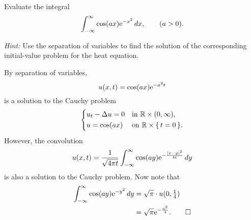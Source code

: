 \begin{problem}
  Evaluate the integral
  \[
    \int_{-\infty}^\infty \cos(ax)\mathrm{e}^{-x^2}\mathop{}\!d x,\qquad (a>0).
  \]

  \noindent\emph{Hint:} Use the separation of variables to find the solution of the
  corresponding initial-value problem for the heat equation.
\end{problem}
\begin{solution*}
  By separation of variables,
  \[
    u(x,t)=\cos(ax)\mathrm{e}^{-a^2t}
  \]
  is a solution to the Cauchy problem
  \[
    \left\{
      \begin{aligned}
        &u_t-\Delta u=0&&\text{in \(\mathbb{R}\times(0,\infty)\),}\\
        &u=\cos(ax)&&\text{on \(\mathbb{R}\times\{\,t=0\,\}\).}
      \end{aligned}
    \right.
  \]
  However, the convolution
  \[
    u(x,t)=%
    \frac{1}{\sqrt{4\pi t}}\int_{-\infty}^\infty%
    \cos(a y)\rme^{-\frac{|x-y|^2}{4t}}\diff y
  \]
  is also a solution to the Cauchy problem. Now note that
  \begin{align*}
    \int_{-\infty}^\infty\cos(ay)\mathrm{e}^{-y^2}\mathop{}\!d y
    &=\sqrt{\pi}\cdot u(0,\tfrac{1}{4})\\
    &=\sqrt{\pi}\mathrm{e}^{-\frac{a^2}{4}}.\qedhere
  \end{align*}
\end{solution*}

